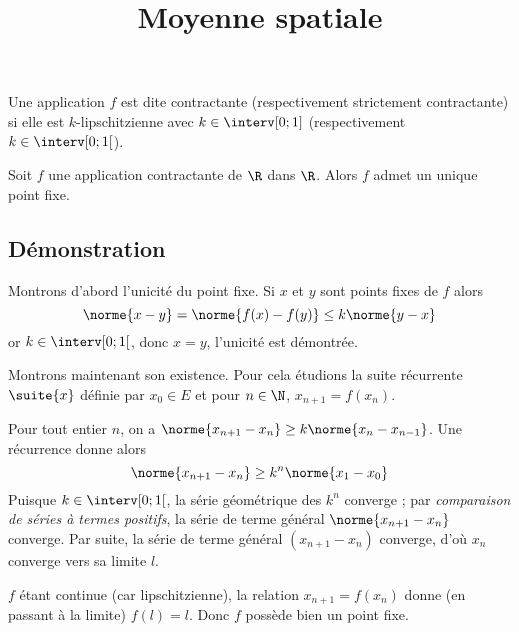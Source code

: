 \documentclass[fontsize=12pt,twoside=false,parskip=half, french]{scrartcl}
\title{Moyenne spatiale}
\date{}
\author{}
\begin{document}
\maketitle
   Une application $f$ est dite contractante (respectivement strictement contractante) si elle est $k$-lipschitzienne avec
   $k \in \interv[0; 1]$ (respectivement $k \in \interv[0; 1[$).
   \begin{Theoreme}      
      Soit $f$ une application contractante de $\R$ dans $\R$. Alors $f$ admet un unique point fixe.
   \end{Theoreme}
   \subsection{Démonstration}
      Montrons d’abord l’unicité du point fixe. Si $x$ et $y$ sont points fixes de $f$ alors
      \[
         \norme{x - y} = \norme{f(x) - f(y)} \leq k\norme{y - x}          
      \]
      or $k \in \interv[0; 1[$, donc $x = y$, l’unicité est démontrée.
      
      Montrons maintenant son existence. Pour cela étudions la suite récurrente $\suite{x}$ définie par
      $x_0 \in E$ et pour $n \in \N$, $x_{n + 1} = f(x_n)$. 
      
      Pour tout entier $n$, on a $\norme{x_{n + 1} - x_n} \geq k\norme{x_n - x_{n - 1}}$. Une récurrence donne alors
      \[
         \norme{x_{n + 1} - x_n} \geq k^n\norme{x_1 - x_0}
      \]
      Puisque $k \in \interv[0; 1[$, la série géométrique des $k^n$ converge ; par \emph{comparaison de séries à termes 
      positifs}, la série de terme général $\norme{x_{n + 1} - x_n}$ converge. Par suite, la série de terme général 
      $(x_{n + 1} - x_n)$ converge, d’où $x_n$ converge vers sa limite $l$.
      
      $f$ étant continue (car lipschitzienne), la relation $x_{n + 1} = f(x_n)$ donne (en passant à la limite) $f(l) = l$. Donc $f$ possède
      bien un point fixe.
\end{document}
